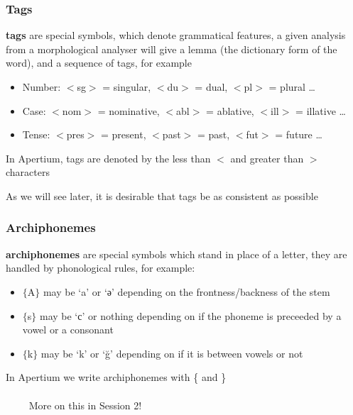 \documentclass[10pt,xetex]{beamer} %
\begin{document}
\begin{frame}
  \frametitle{Tags} %

{\bf tags} are special symbols, which denote grammatical features, a given analysis
from a morphological analyser will give a lemma (the dictionary form of the word),
and a sequence of tags, for example

\begin{itemize}
  \item Number: $<$sg$>$ = singular, $<$du$>$ = dual, $<$pl$>$ = plural \ldots
  \item Case: $<$nom$>$ = nominative, $<$abl$>$ = ablative, $<$ill$>$ = illative \ldots
  \item Tense: $<$pres$>$ = present, $<$past$>$ = past, $<$fut$>$ = future \ldots
\end{itemize}

In Apertium, tags are denoted by the less than $<$ and greater than $>$ characters

As we will see later, it is desirable that tags be as consistent as possible

\end{frame}

\begin{frame}
  \frametitle{Archiphonemes}

  {\bf archiphonemes} are special symbols which stand in place of a letter, they
    are handled by phonological rules, for example:

\begin{itemize}
  \item $\{$A$\}$ may be `a' or `ә' depending on the frontness/backness of the stem
  \item $\{$s$\}$ may be `с' or nothing depending on if the phoneme is preceeded by a vowel or a consonant
  \item $\{$k$\}$ may be `k' or `ğ' depending on if it is between vowels or not
\end{itemize}

In Apertium we write archiphonemes with \{ and \}\\
~\\

~~~~ More on this in Session 2!

\end{frame}
\end{document}
